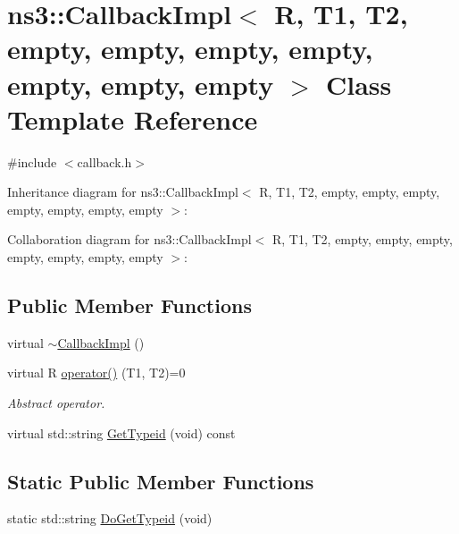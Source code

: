 \hypertarget{classns3_1_1CallbackImpl_3_01R_00_01T1_00_01T2_00_01empty_00_01empty_00_01empty_00_01empty_00_01485b3ffdfff1bf20d1d8cf74dc9cb324}{}\section{ns3\+:\+:Callback\+Impl$<$ R, T1, T2, empty, empty, empty, empty, empty, empty, empty $>$ Class Template Reference}
\label{classns3_1_1CallbackImpl_3_01R_00_01T1_00_01T2_00_01empty_00_01empty_00_01empty_00_01empty_00_01485b3ffdfff1bf20d1d8cf74dc9cb324}


{\ttfamily \#include $<$callback.\+h$>$}



Inheritance diagram for ns3\+:\+:Callback\+Impl$<$ R, T1, T2, empty, empty, empty, empty, empty, empty, empty $>$\+:


Collaboration diagram for ns3\+:\+:Callback\+Impl$<$ R, T1, T2, empty, empty, empty, empty, empty, empty, empty $>$\+:
\subsection*{Public Member Functions}
\begin{DoxyCompactItemize}
\item 
virtual \hyperlink{classns3_1_1CallbackImpl_3_01R_00_01T1_00_01T2_00_01empty_00_01empty_00_01empty_00_01empty_00_01485b3ffdfff1bf20d1d8cf74dc9cb324_a810e04608a9dcb14db877f545d45db5d}{$\sim$\+Callback\+Impl} ()
\item 
virtual R \hyperlink{classns3_1_1CallbackImpl_3_01R_00_01T1_00_01T2_00_01empty_00_01empty_00_01empty_00_01empty_00_01485b3ffdfff1bf20d1d8cf74dc9cb324_a2acce601bb3e9055a0f94ae61feedc3e}{operator()} (T1, T2)=0
\begin{DoxyCompactList}\small\item\em Abstract operator. \end{DoxyCompactList}\item 
virtual std\+::string \hyperlink{classns3_1_1CallbackImpl_3_01R_00_01T1_00_01T2_00_01empty_00_01empty_00_01empty_00_01empty_00_01485b3ffdfff1bf20d1d8cf74dc9cb324_a3a814021e7f3f730eb3e64c66275212e}{Get\+Typeid} (void) const 
\end{DoxyCompactItemize}
\subsection*{Static Public Member Functions}
\begin{DoxyCompactItemize}
\item 
static std\+::string \hyperlink{classns3_1_1CallbackImpl_3_01R_00_01T1_00_01T2_00_01empty_00_01empty_00_01empty_00_01empty_00_01485b3ffdfff1bf20d1d8cf74dc9cb324_a07dc4f51acfb78594758cd2f332634ef}{Do\+Get\+Typeid} (void)
\end{DoxyCompactItemize}
